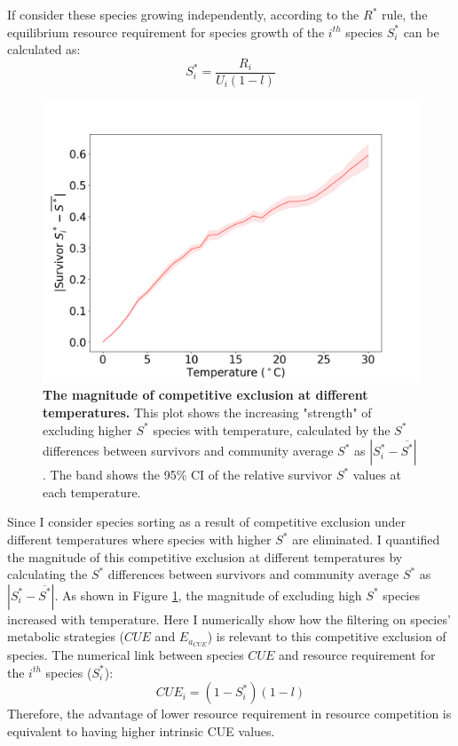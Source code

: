 \documentclass[11pt, a4paper]{article}
\begin{document}
\begin{spacing}{1.5}
If consider these species growing independently, according to the $R^*$ rule, the equilibrium resource requirement for species growth of the $i^{th}$ species $S^*_i$ can be calculated as: 
\begin{equation}\label{eq:S*}
S^*_i = \frac{R_i}{U_i(1-l)}
\end{equation}

\begin{figure}
    \centering
    \includegraphics[scale=0.3]{./Figures/eq_st.png}
    \caption{\textbf{The magnitude of competitive exclusion at different temperatures.} This plot shows the increasing "strength" of excluding higher $S^*$ species with temperature, calculated by the $S^*$ differences between survivors and community average $S^*$ as $|S_i^* - \overline{S^*}|$. The band shows the 95\% CI of the relative survivor $S^*$ values at each temperature.}
    \label{fig:Sdiff}
\end{figure}

Since I consider species sorting as a result of competitive exclusion under different temperatures where species with higher $S^*$ are eliminated. I quantified the magnitude of this competitive exclusion at different temperatures by calculating the $S^*$ differences between survivors and community average $S^*$ as $|S_i^* - \overline{S^*}|$. As shown in Figure \ref{fig:Sdiff}, the magnitude of excluding high $S^*$ species increased with temperature. Here I numerically show how the filtering on species' metabolic strategies ($CUE$ and $E_{a_{CUE}}$) is relevant to this competitive exclusion of species. The numerical link between species $CUE$ and resource requirement for the $i^{th}$ species ($S^*_i$):
\begin{equation}\label{eq:S_CUE}
CUE_i = (1 - S^*_i) (1-l)
\end{equation}
Therefore, the advantage of lower resource requirement in resource competition is equivalent to having higher intrinsic CUE values. 


\end{spacing}
\end{document}
